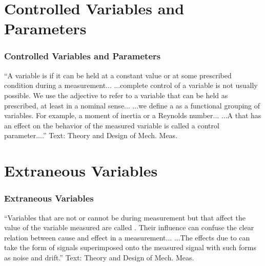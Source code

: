 \documentclass[fleqn]{beamer} %
\newcommand{\sectiontitleIII}{Controlled Variables and Parameters}
\newcommand{\sectiontitleIV}{Extraneous Variables}
\begin{document}
\section{\sectiontitleIII}
\begin{frame}[label=sectionIII]
\frametitle{\sectiontitleIII}

{``A variable is \hspcuu if it can be held at a constant value
or at some prescribed condition during a measurement... ...complete control of a variable is not usually
possible. We use the adjective \hspcuu to refer to a variable that can be held as prescribed, at
least in a nominal sense... \vspc
...we define a \hspcuu as a functional grouping of variables. For example, a moment of inertia or a Reynolds number... ...A \hspcuu that has an effect on the behavior of the measured variable is called a control parameter....''} \vspc
{\tiny Text: Theory and Design of Mech. Meas.}

\end{frame}

\section{\sectiontitleIV}
\begin{frame}[label=sectionIV]
\frametitle{\sectiontitleIV}

{``Variables that are not or cannot be \hspcuu during measurement but that affect the value of the
variable measured are called \hspcuu \hspcc \hspcuu. Their influence can confuse the clear relation
between cause and effect in a measurement... ...The effects due to \hspcuu \hspcc \hspcuu can take the form of signals superimposed
onto the measured signal with such forms as {\PR noise} and drift.''} \vspc
{\tiny Text: Theory and Design of Mech. Meas.}

\end{frame}

\end{document}
